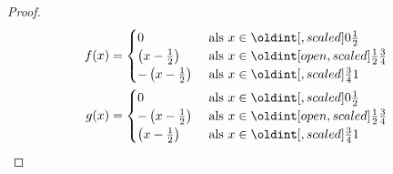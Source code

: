 \documentclass[main.tex]{subfiles}
\begin{document}
\begin{tvb}
\begin{proof}
\begin{minipage}{.45\textwidth}
      \begin{align*}
        f(x) = 
        \begin{cases}
          0 &\text{ als } x \in \interval{0}{\frac{1}{2}}\\
          \left(x-\frac{1}{2}\right) &\text{ als } x \in \interval[open]{\frac{1}{2}}{\frac{3}{4}}\\
          -\left(x-\frac{1}{2}\right) &\text{ als } x \in \interval{\frac{3}{4}}{1}
        \end{cases}\\
        g(x) = 
        \begin{cases}
          0 &\text{ als } x \in \interval{0}{\frac{1}{2}}\\
          -\left(x-\frac{1}{2}\right) &\text{ als } x \in \interval[open]{\frac{1}{2}}{\frac{3}{4}}\\
          \left(x-\frac{1}{2}\right) &\text{ als } x \in \interval{\frac{3}{4}}{1}
        \end{cases}\\
      \end{align*}
    \end{minipage}
  \end{proof}
\end{tvb}
\end{document}
